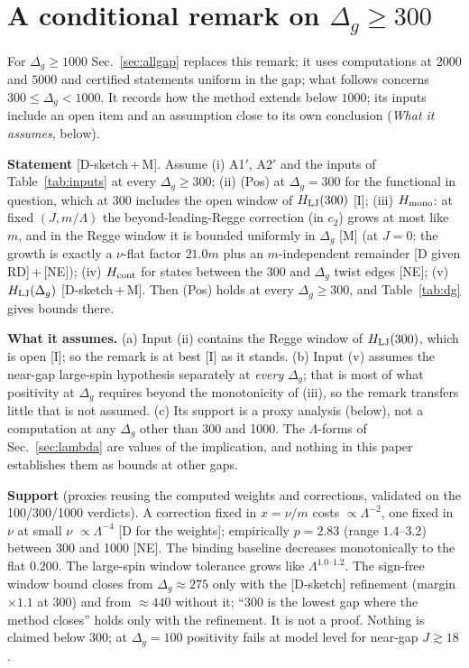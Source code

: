 \documentclass[aps,prl,onecolumn,superscriptaddress,nofootinbib]{revtex4-2}
\begin{document}
\section{A conditional remark on \texorpdfstring{$\Delta_g\ge300$}{Delta g >= 300}}
\label{sec:cor}

For $\Delta_g\ge1000$ Sec.~\ref{sec:allgap} replaces this remark; it uses computations at $2000$ and $5000$
and certified statements uniform in the gap; what follows concerns $300\le\Delta_g<1000$.
It records how the method extends below $1000$; its inputs include an open item and an assumption close to its own conclusion (\emph{What it assumes}, below).

\textbf{Statement} [D-sketch\,+\,M]. Assume (i) A1$'$, A2$'$ and the inputs of Table~\ref{tab:inputs} at
every $\Delta_g\ge300$; (ii) (Pos) at $\Delta_g=300$ for the functional in question, which at 300
includes the open window of $H_{\rm LJ}(300)$ [I]; (iii) $H_{\rm mono}$: at fixed $(J,m/\Lambda)$ the
beyond-leading-Regge correction (in $c_2$) grows at most like $m$, and in the Regge window it is
bounded uniformly in $\Delta_g$ [M] (at $J=0$: the growth is exactly a $\nu$-flat factor $21.0m$ plus an
$m$-independent remainder [D given RD]\,+\,[NE]); (iv) $H_{\rm cont}$ for states between the 300 and $\Delta_g$
twist edges [NE]; (v) $H_{\rm LJ}(\Delta_g)$ [D-sketch\,+\,M]. Then (Pos) holds at every
$\Delta_g\ge300$, and Table~\ref{tab:dg} gives bounds there.

\textbf{What it assumes.} (a) Input (ii) contains the Regge window of $H_{\rm LJ}(300)$, which is open [I]; so the
remark is at best [I] as it stands. (b) Input (v) assumes the near-gap large-spin hypothesis separately at
\emph{every} $\Delta_g$; that is most of what positivity at $\Delta_g$ requires beyond the monotonicity of (iii),
so the remark transfers little that is not assumed. (c) Its support is a proxy analysis (below), not a
computation at any $\Delta_g$ other than 300 and 1000. The $\Lambda$-forms of Sec.~\ref{sec:lambda} are values of the
implication, and nothing in this paper establishes them as bounds at other gaps.

\textbf{Support} (proxies reusing the computed weights and corrections, validated on the
100/300/1000 verdicts). A correction fixed in $x=\nu/m$ costs $\propto\Lambda^{-2}$, one fixed in $\nu$
at small $\nu$ $\propto\Lambda^{-4}$ [D for the weights]; empirically $p=2.83$ (range $1.4$--$3.2$) between
300 and 1000 [NE]. The binding baseline decreases monotonically to the flat $0.200$. The large-spin
window tolerance grows like $\Lambda^{1.0\text{--}1.2}$. The sign-free window bound closes from $\Delta_g\approx275$
only with the [D-sketch] refinement (margin $\times1.1$ at 300) and from $\approx440$ without it; ``300 is the lowest
gap where the method closes'' holds only with the refinement. It is not a proof. Nothing is claimed below
300; at $\Delta_g=100$ positivity fails at model level for near-gap $J\gtrsim18$.
\end{document}
